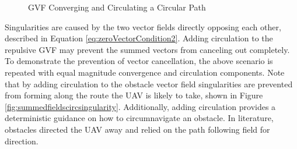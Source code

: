 \documentclass[numbered,pdftex]{ohio-etd}
\begin{document}
\begin{figure}[H]
	\begin{subfigmatrix}{2}%
		\centering	
		\hspace*{0mm}
	\end{subfigmatrix}
	\caption{GVF Converging and Circulating a Circular Path}
	\label{fig:noCircSingularityDetection}
\end{figure}

Singularities are caused by the two vector fields directly opposing each other, described in Equation \ref{eq:zeroVectorCondition2}. Adding circulation to the repulsive GVF may prevent the summed vectors from canceling out completely. To demonstrate the prevention of vector cancellation, the above scenario is repeated with equal magnitude convergence and circulation components. Note that by adding circulation to the obstacle vector field singularities are prevented from forming along the route the UAV is likely to take, shown in Figure \ref{fig:summedfieldscircsingularity}. Additionally, adding circulation provides a deterministic guidance on how to circumnavigate an obstacle. In literature, obstacles directed the UAV away and relied on the path following field for direction. 
\end{document}
